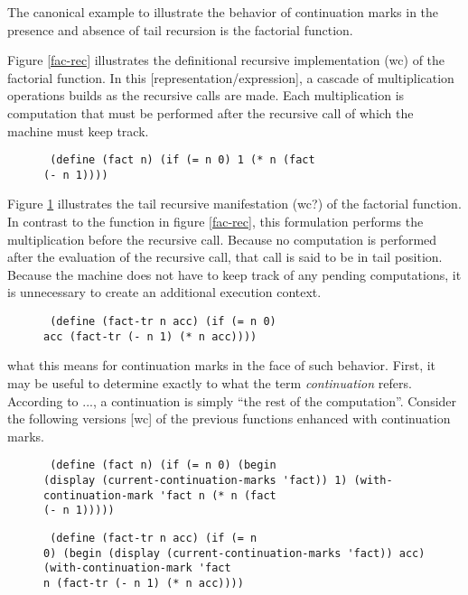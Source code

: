 \documentclass[ms]{byuprop} %
\begin{document}
The canonical example to illustrate the behavior of continuation marks in the presence and
absence of tail recursion is the factorial function.

Figure \ref{fac-rec} illustrates the definitional recursive implementation (wc) of the
factorial function. In this [representation/expression], a cascade of multiplication
operations builds as the recursive calls are made. Each multiplication is computation that
must be performed after the recursive call of which the machine must keep track.


\begin{figure}  \begin{verbatim} (define (fact n) (if (= n 0) 1 (* n (fact
(- n 1)))) \end{verbatim} \end{figure}

Figure \ref{fac-tail-rec} illustrates the tail recursive manifestation (wc?) of the
factorial function. In contrast to the function in figure \ref{fac-rec}, this formulation
performs the multiplication before the recursive call. Because no computation is performed
after the evaluation of the recursive call, that call is said to be in tail position.
Because the machine does not have to keep track of any pending computations, it is
unnecessary to create an additional execution context.

\begin{figure} \label{fac-tail-rec} \begin{verbatim} (define (fact-tr n acc) (if (= n 0)
acc (fact-tr (- n 1) (* n acc)))) \end{verbatim} \end{figure}

what this means for continuation marks in the face of such behavior. First, it may be
useful to determine exactly to what the term \emph{continuation} refers. According to ...,
a continuation is simply ``the rest of the computation''. Consider the following versions
[wc] of the previous functions enhanced with continuation marks.

\begin{figure} \label{fac-rec-cm} \begin{verbatim} (define (fact n) (if (= n 0) (begin
(display (current-continuation-marks 'fact)) 1) (with-continuation-mark 'fact n (* n (fact
(- n 1))))) \end{verbatim} \end{figure}

\begin{figure} \label{fac-tail-rec-cm} \begin{verbatim} (define (fact-tr n acc) (if (= n
0) (begin (display (current-continuation-marks 'fact)) acc) (with-continuation-mark 'fact
n (fact-tr (- n 1) (* n acc)))) \end{verbatim} \end{figure}
\end{document}

